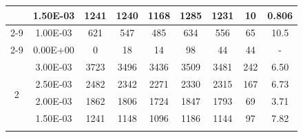 \begin{table}[H]
{\begin{tabular}{|c|c|c|c|c|c|c|c|c|}
                               & 1.50E-03         & 1241      & 1240                                                       & 1168                                                      & 1285                                                      & 1231    & 10     & 0.806                                                              \\ \cline{2-9}
                               & 1.00E-03         & 621       & 547                                                        & 485                                                       & 634                                                       & 556     & 65     & 10.5                                                               \\ \cline{2-9}
                               & 0.00E+00         & 0         & 18                                                         & 14                                                        & 98                                                        & 44      & 44     & -                                                                  \\ \hline
            \multirow{6}{*}{2} & 3.00E-03         & 3723      & 3496                                                       & 3436                                                      & 3509                                                      & 3481    & 242    & 6.50                                                               \\ \cline{2-9}
                               & 2.50E-03         & 2482      & 2342                                                       & 2271                                                      & 2330                                                      & 2315    & 167    & 6.73                                                               \\ \cline{2-9}
                               & 2.00E-03         & 1862      & 1806                                                       & 1724                                                      & 1847                                                      & 1793    & 69     & 3.71                                                               \\ \cline{2-9}
                               & 1.50E-03         & 1241      & 1148                                                       & 1096                                                      & 1186                                                      & 1144    & 97     & 7.82                                                               \\ \cline{2-9}

\end{tabular}}
\end{table}
